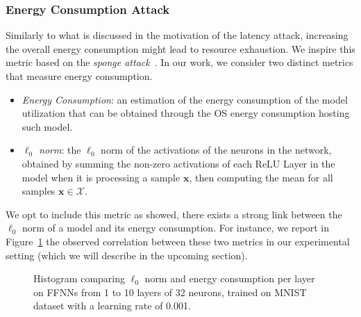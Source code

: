 \subsubsection{Energy Consumption Attack}
\label{subsub:energy}
Similarly to what is discussed in the motivation of the latency attack, increasing the overall energy consumption might lead to resource exhaustion. 
We inspire this metric based on the \textit{sponge attack}~\cite{shumailov2021sponge}. 
In our work, we consider two distinct metrics that measure energy consumption. 
\begin{itemize}
    \item \textit{Energy Consumption}: an estimation of the energy consumption of the model utilization that can be obtained through the OS energy consumption hosting such model. 
    \item \textit{$\ell_0$ norm}: the $\ell_0$ norm of the activations of the neurons in the network, obtained by summing the non-zero activations of each ReLU Layer in the model when it is processing a sample $\bm{x}$, then computing the mean for all samples $\bm{x} \in \mathcal{X}$. 
\end{itemize}
We opt to include this metric as \cite{cina2022energy} showed, there exists a strong link between the $\ell_0$ norm of a model and its energy consumption.
For instance, we report in Figure~\ref{l0_energy} the observed correlation between these two metrics in our experimental setting (which we will describe in the upcoming section).  

\begin{figure}[!htbp]
    \footnotesize
    \centering
    
    \caption[Histogram comparing $\ell_0$ norm and energy consumption per layer.]{Histogram comparing $\ell_0$ norm and energy consumption per layer on FFNNs from 1 to 10 layers of 32 neurons, trained on MNIST dataset with a learning rate of 0.001.}
    \label{l0_energy}
\end{figure}



